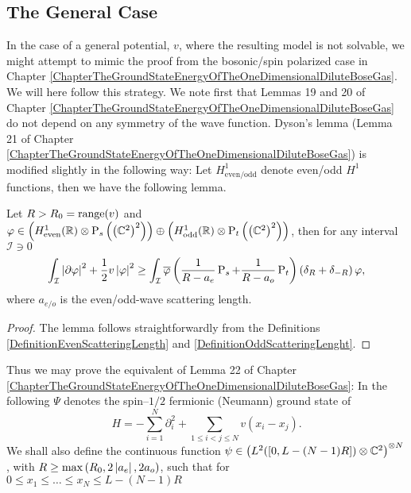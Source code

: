 \subsection{The General Case}
In the case of a general potential, $ v $, where the resulting model is not solvable, we might attempt to mimic the proof from the bosonic/spin polarized case in Chapter \ref{ChapterTheGroundStateEnergyOfTheOneDimensionalDiluteBoseGas}. We will here follow this strategy. We note first that Lemmas 19 and 20 of Chapter \ref{ChapterTheGroundStateEnergyOfTheOneDimensionalDiluteBoseGas} do not depend on any symmetry of the wave function. Dyson's lemma (Lemma 21 of Chapter \ref{ChapterTheGroundStateEnergyOfTheOneDimensionalDiluteBoseGas}) is modified slightly in the following way: Let $ H^1_{\text{even/odd}} $ denote even/odd $ H^1 $ functions, then we have the following lemma.
\begin{lemma}
	\label{LemmaDysonSpin1/2Fermi}
	Let $ R>R_0=\textnormal{range}(v) $ and $ \varphi\in \left(H_{\textnormal{even}}^1(\mathbb{R})\otimes\operatorname{P}_s \left(\left(\mathbb{C}^2\right)^2\right)\right)\oplus\left(H_{\textnormal{odd}}^1(\mathbb{R})\otimes \operatorname{P}_t \left(\left(\mathbb{C}^2\right)^2\right) \right) $, then for any interval $ \mathcal{I}\ni 0 $ 
	\begin{equation}
	\int_{\mathcal{I}} \left\lvert \partial \varphi \right\rvert^2+\frac12 v\left\lvert \varphi \right\rvert^2\geq \int_{\mathcal{I}}\overline{\varphi}\left(\frac{1}{R-a_e}\operatorname{P}_s+\frac{1}{R-a_o}\operatorname{P}_t\right)\left(\delta_R+\delta_{-R}\right)\varphi,
	\end{equation}
	where $ a_{e/o} $ is the even/odd-wave scattering length.
\end{lemma}
\begin{proof}
	The lemma follows straightforwardly from the Definitions \ref{DefinitionEvenScatteringLength} and \ref{DefinitionOddScatteringLenght}.
\end{proof}
Thus we may prove the equivalent of Lemma 22 of Chapter \ref{ChapterTheGroundStateEnergyOfTheOneDimensionalDiluteBoseGas}: In the following $ \Psi $ denotes the spin--$ 1/2 $ fermionic (Neumann) ground state of \begin{equation}
H=-\sum_{i=1}^{N}\partial_i^2+\sum_{1\leq i<j\leq N}v(x_i-x_j).
\end{equation}	
We shall also define the continuous function $ \psi\in \left(L^2([0,L-(N-1)R])\otimes\mathbb{C}^2\right)^{\otimes N} $, with $ R\geq \max\left(R_0,2\left\lvert a_e \right\rvert,2a_o\right)  $, such that for $ 0\leq x_1\leq\dots\leq x_N\leq L-(N-1)R $
